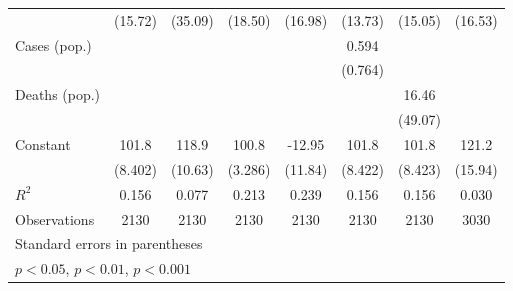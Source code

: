 \documentclass{article}
\begin{document}
{\begin{longtable}{l*{7}{c}}
                &  (15.72)         &  (35.09)         &  (18.50)         &  (16.98)         &  (13.73)         &  (15.05)         &  (16.53)         \\
Cases (pop.)    &                  &                  &                  &                  &    0.594         &                  &                  \\
                &                  &                  &                  &                  &  (0.764)         &                  &                  \\
Deaths (pop.)   &                  &                  &                  &                  &                  &    16.46         &                  \\
                &                  &                  &                  &                  &                  &  (49.07)         &                  \\
Constant        &    101.8\sym{***}&    118.9\sym{***}&    100.8\sym{***}&   -12.95         &    101.8\sym{***}&    101.8\sym{***}&    121.2\sym{***}\\
                &  (8.402)         &  (10.63)         &  (3.286)         &  (11.84)         &  (8.422)         &  (8.423)         &  (15.94)         \\
\hline
\(R^{2}\)       &    0.156         &    0.077         &    0.213         &    0.239         &    0.156         &    0.156         &    0.030         \\
Observations    &     2130         &     2130         &     2130         &     2130         &     2130         &     2130         &     3030         \\
\hline\hline
\multicolumn{8}{l}{\footnotesize Standard errors in parentheses}\\
\multicolumn{8}{l}{\footnotesize \sym{*} \(p<0.05\), \sym{**} \(p<0.01\), \sym{***} \(p<0.001\)}\\
\end{longtable}
}
\end{document}
